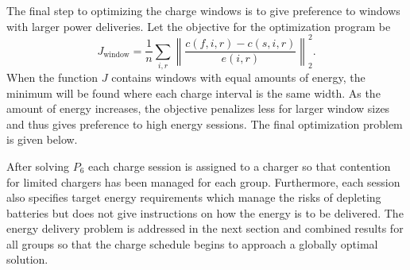 \par The final step to optimizing the charge windows is to give preference to windows with larger power deliveries. Let the objective for the optimization program be 
\begin{equation}\label{eqn:optChargeSchedule:objective}
	J_{\text{window}} = \frac{1}{n}\sum_{i,r} \left \lVert \frac{c(f,i,r) - c(s,i,r)}{e(i,r)} \right \rVert^2_2.
\end{equation}
When the function $J$ contains windows with equal amounts of energy, the minimum will be found where each charge interval is the same width. As the amount of energy increases, the objective penalizes less for larger window sizes and thus gives preference to high energy sessions.
The final optimization problem is given below.\\[0.1in]

\par After solving $P_6$ each charge session is assigned to a charger so that contention for limited chargers has been managed for each group. Furthermore, each session also specifies target energy requirements which manage the risks of depleting batteries but does not give instructions on how the energy is to be delivered. The energy delivery problem is addressed in the next section and combined results for all groups so that the charge schedule begins to approach a globally optimal solution.
